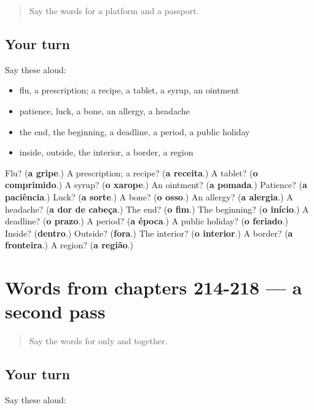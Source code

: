 \label{lesson:PT-R218-first-pass-words-from-chapters-210-213}



\begin{quote}
Say the words for a platform and a passport.
\end{quote}

\subsection*{Your turn}
Say these aloud:

\begin{itemize}
\raggedright
  \item flu, a prescription; a recipe, a tablet, a syrup, an ointment
  \item patience, luck, a bone, an allergy, a headache
  \item the end, the beginning, a deadline, a period, a public holiday
  \item inside, outside, the interior, a border, a region
\end{itemize}

\begin{tcolorbox}[breakable,colback=teal!4,colframe=teal!35!black,title={Before you move on}]
Flu? (\textbf{a gripe}.) A prescription; a recipe? (\textbf{a receita}.) A tablet? (\textbf{o comprimido}.) A syrup? (\textbf{o xarope}.) An ointment? (\textbf{a pomada}.) Patience? (\textbf{a paciência}.) Luck? (\textbf{a sorte}.) A bone? (\textbf{o osso}.) An allergy? (\textbf{a alergia}.) A headache? (\textbf{a dor de cabeça}.) The end? (\textbf{o fim}.) The beginning? (\textbf{o início}.) A deadline? (\textbf{o prazo}.) A period? (\textbf{a época}.) A public holiday? (\textbf{o feriado}.) Inside? (\textbf{dentro}.) Outside? (\textbf{fora}.) The interior? (\textbf{o interior}.) A border? (\textbf{a fronteira}.) A region? (\textbf{a região}.)
\end{tcolorbox}
\section[(dialogue)]{Words from chapters 214-218 — a second pass}

\label{lesson:PT-R218-second-pass-words-from-chapters-214-218}



\begin{quote}
Say the words for only and together.
\end{quote}

\subsection*{Your turn}
Say these aloud:

